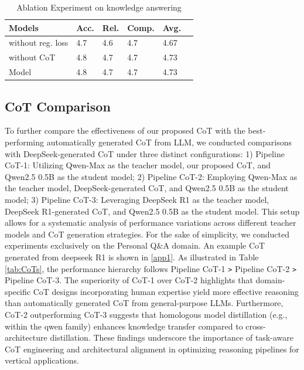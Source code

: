 \documentclass[preprint,12pt]{elsarticle}
\begin{document}
\begin{table}[H]
\centering
\caption{\label{tab:table_ablation_K}Ablation Experiment on knowledge answering}
\setlength{\tabcolsep}{2pt} %
\renewcommand{\arraystretch}{1.0} %
\begin{tabular}{l p{1.1cm} p{1.1cm} p{1.2cm} p{1.1cm}  p{1.1cm}}
\toprule
Models & Acc. & Rel. & Comp. & \textbf{Avg.} \\
\midrule
without reg. loss  & 4.7 & 4.6 & 4.7 & 4.67 \\
without CoT & 4.8 & 4.7 & 4.7 & 4.73 \\
Model & 4.8 & 4.7 & 4.7 & 4.73 \\
\bottomrule
\end{tabular}
\end{table}
\subsection{CoT Comparison}
To further compare the effectiveness of our proposed CoT with the best-performing automatically generated CoT from LLM, we conducted comparisons with DeepSeek-generated CoT\cite{guo2025deepseek} under three distinct configurations: 1) Pipeline CoT-1: Utilizing Qwen-Max as the teacher model, our proposed CoT, and Qwen2.5 0.5B as the student model; 2) Pipeline CoT-2: Employing Qwen-Max as the teacher model, DeepSeek-generated CoT, and Qwen2.5 0.5B as the student model; 3) Pipeline CoT-3: Leveraging DeepSeek R1 as the teacher model, DeepSeek R1-generated CoT, and Qwen2.5 0.5B as the student model. This setup allows for a systematic analysis of performance variations across different teacher models and CoT generation strategies. 
For the sake of simplicity, we conducted experiments exclusively on the Personal Q\&A domain. An example CoT generated from deepseek R1 is shown in \ref{app1}. As illustrated in Table \ref{tab:CoTs}, the performance hierarchy follows Pipeline CoT-1 \texttt{\textgreater} Pipeline CoT-2 \texttt{\textgreater} Pipeline CoT-3. The superiority of CoT-1 over CoT-2 highlights that domain-specific CoT designs incorporating human expertise yield more effective reasoning than automatically generated CoT from general-purpose LLMs. Furthermore, CoT-2 outperforming CoT-3 suggests that homologous model distillation (e.g., within the qwen family) enhances knowledge transfer compared to cross-architecture distillation. These findings underscore the importance of task-aware CoT engineering and architectural alignment in optimizing reasoning pipelines for vertical applications.
\end{document}
